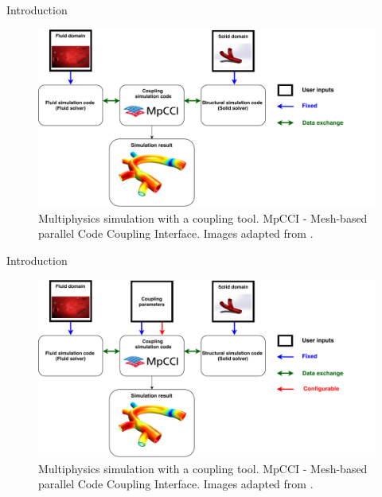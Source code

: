 \documentclass[10pt]{beamer}
\begin{document}
\begin{frame}[t]{Introduction}
\begin{figure}
\centering
		\includegraphics[width=\textwidth, height=0.7\textheight]{images/Coupled_simulation-wocoupling.pdf}
		\captionsetup{justification=justified,margin=0.2cm}
		\caption{Multiphysics simulation with a coupling tool. MpCCI - Mesh-based parallel Code Coupling Interface. Images adapted from \cite{Blood-vessel} \cite{blood} \cite{vessel}.}
\end{figure}
\end{frame}


\begin{frame}[t, noframenumbering]{Introduction}
\begin{figure}\addtocounter{figure}{-1}
\centering
		\includegraphics[width=\textwidth, height=0.7\textheight]{images/Coupled_simulation-new.pdf}
		\captionsetup{justification=justified,margin=0.2cm}
		\caption{Multiphysics simulation with a coupling tool. MpCCI - Mesh-based parallel Code Coupling Interface. Images adapted from \cite{Blood-vessel} \cite{blood} \cite{vessel}.}
\end{figure}
\end{frame}
\end{document}
